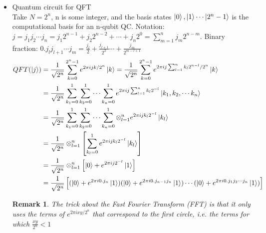 \documentclass[]{article}
\newtheorem*{remark}{Remark}
\newtheorem*{example}{Example}
\theoremstyle{nonumberplain}
\begin{document}
\begin{itemize}
\begin{example}
\end{example}
\item Quantum circuit for QFT \\
Take $N=2^{n}$, n is some integer, and the basis states $\ket{0},\ket{1}\cdots\ket{2^{n}-1}$ is the computational basis for an n-qubit QC. Notation: $j=j_{1}j_{2}\cdots j_{n}=j_{1}2^{n-1}+j_{2}2^{n-2}+\cdots + j_{n}2^{0}= \sum^{n}_{m=1} j_{m}2^{n-m}$. Binary fraction: $0.j_{l}j_{l+1}\cdots j_{m} = \frac{j_{l}}{2}+\frac{j_{l+1}}{2^{2}}\cdots + \frac{j_{m}}{2^{m-l+1}}$ 
\begin{equation*}
\begin{aligned}
	QFT(\ket{j}) &= \frac{1}{\sqrt{2^{n}}} \sum^{2^{n}-1}_{k=0} e^{2\pi i j k /2^{n}}\ket{k} = \frac{1}{\sqrt{2^{n}}} \sum^{2^{n}-1}_{k=0} e^{2\pi i j \sum^{n}_{l=1} k_{l}2^{n-l}/2^{n}}\ket{k} \\
					 &= \frac{1}{\sqrt{2^{n}}} \sum^{1}_{k_{1}=0}   \sum^{1}_{k_{2}=0} \cdots \sum^{1}_{k_{n}=0} e^{2\pi i j \sum^{n}_{l=1} k_{l}2^{-l}}\ket{k_{1},k_{2},\cdots k_{n}}  \\
					 &= \frac{1}{\sqrt{2^{n}}} \sum^{1}_{k_{1}=0}   \sum^{1}_{k_{2}=0} \cdots \sum^{1}_{k_{n}=0} \otimes^{n}_{l=1} e^{2\pi i j k_{l}2^{-l}}\ket{k_{l}} \\
					 &= \frac{1}{\sqrt{2^n}}\otimes^{n}_{l=1}\left[ \sum^{1}_{k_{l}=0} e^{2\pi i j k_{l} 2^{-l}}\ket{k_{l}}\right] \\
					 &= \frac{1}{\sqrt{2^n}}\otimes^{n}_{l=1}\left[ \ket{0}+e^{2\pi i j 2^{-l}}\ket{1}\right] \\
					 &= \frac{1}{\sqrt{2^{n}}}\left[(\ket{0}+e^{2\pi i 0.j_{n}}\ket{1})(\ket{0}+e^{2\pi i 0.j_{n-1}j_{n}}\ket{1})\cdots (\ket{0}+e^{2\pi i 0.j_{1}j_{2}\cdots j_{n}}\ket{1})\right]
\end{aligned}
\end{equation*}
\begin{remark}
	The trick about the Fast Fourier Transform (FFT) is that it only uses the terms of $e^{2\pi i x y/2^{n}}$ that correspond to the first circle, i.e. the terms for which $\frac{xy}{2^{n}} < 1$
\end{remark}
\end{itemize}
\end{document}
